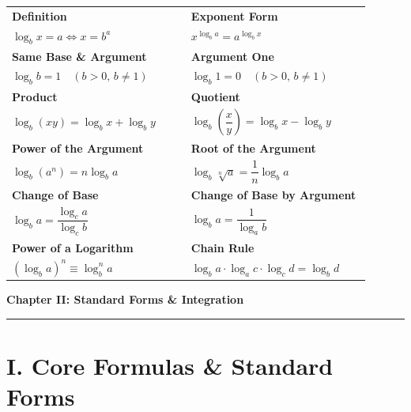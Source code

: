 \documentclass[11pt, a4paper]{article}
\begin{document}
\begin{center}
\begin{tabular}{@{}p{0.45\linewidth} p{0.45\linewidth}@{}}
\toprule
\textbf{Definition} & \textbf{Exponent Form} \\
$\log_b x = a \iff x = b^a$ & $x^{\log_b a} = a^{\log_b x}$ \\
\midrule
\textbf{Same Base \& Argument} & \textbf{Argument One} \\
$\log_b b = 1 \quad (b>0,\, b\neq 1)$ & $\log_b 1 = 0 \quad (b>0,\, b\neq 1)$ \\
\midrule
\textbf{Product} & \textbf{Quotient} \\
$\log_b(xy) = \log_b x + \log_b y$ & $\log_b\!\left(\dfrac{x}{y}\right) = \log_b x - \log_b y$ \\[2mm]
\midrule
\textbf{Power of the Argument} & \textbf{Root of the Argument} \\
$\log_b(a^n) = n\log_b a$ & $\log_b \sqrt[n]{a} = \dfrac{1}{n}\log_b a$ \\[2mm]
\midrule
\textbf{Change of Base} & \textbf{Change of Base by Argument} \\
$\log_b a = \dfrac{\log_c a}{\log_c b}$ & $\log_b a = \dfrac{1}{\log_a b}$ \\[2mm]
\midrule
\textbf{Power of a Logarithm} & \textbf{Chain Rule} \\
$(\log_b a)^n \equiv \log_b^n a$ & $\log_b a \cdot \log_a c \cdot \log_c d = \log_b d$ \\
\bottomrule
\end{tabular}
\end{center}

\newpage

\begin{center}
    {\LARGE \bfseries \color{accent} Chapter II: Standard Forms \& Integration}\\
    \vspace{0.2cm}
    {\color{accent}\rule{0.55\linewidth}{0.8pt}}
\end{center}
\vspace{0.35cm}


\section*{\color{primary} I. Core Formulas \& Standard Forms}
\end{document}
